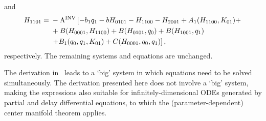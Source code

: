 and
\begin{equation*}
\begin{aligned}
H_{1101} ={}& -\operatorname{A^{\text{INV}}} \left[ -b_1 q_1 -b H_{0101} - H_{1100} - H_{2001} + A_1(H_{1100},K_{01}) + \right. \\
				& + B(H_{0001},H_{1100}) + B(H_{0101},q_0) + B(H_{1001},q_1) \\
				& \left. + B_1(q_0,q_1,K_{01}) + C(H_{0001},q_0,q_1) \right],
\end{aligned}
\end{equation*}
respectively. The remaining systems and equations are unchanged.



\begin{remark}
The derivation in~\cite{Al-Hdaibat2016,Kuznetsov2014improved} leads to a `big'
system in which equations need to be solved simultaneously. The derivation
presented here does not involve a `big' system, making the expressions also
suitable for infinitely-dimensional ODEs generated by partial and
delay differential equations, to which the (parameter-dependent) center
manifold theorem applies.
\end{remark}

